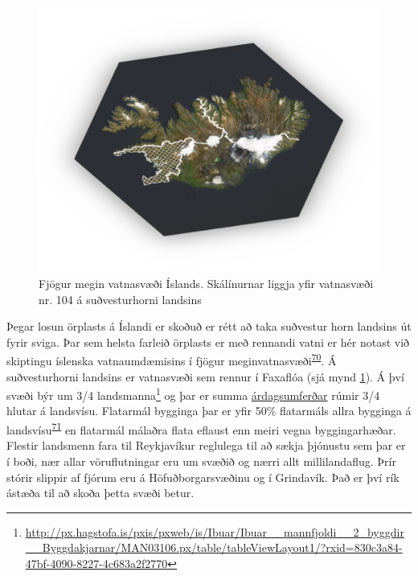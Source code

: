 \documentclass[icelandic,]{book}
\let\rmarkdownfootnote\footnote%
\def\footnote{\protect\rmarkdownfootnote}
\begin{document}
\begin{figure}

{\centering \includegraphics[width=1\linewidth]{myndir/map} 

}

\caption{Fjögur megin vatnasvæði Íslands. Skálínurnar liggja yfir vatnasvæði nr. 104 á suðvesturhorni landsins}\label{fig:vatnasvidsv}
\end{figure}

Þegar losun örplasts á Íslandi er skoðuð er rétt að taka suðvestur horn landsins út fyrir sviga. Þar sem helsta farleið örplasts er með rennandi vatni er hér notast við skiptingu íslenska vatnaumdæmisins í fjögur meginvatnasvæði\textsuperscript{\protect\hyperlink{ref-Bj2012}{70}}. Á suðvesturhorni landsins er vatnasvæði sem rennur í Faxaflóa (sjá mynd \ref{fig:vatnasvidsv}). Á því svæði býr um 3/4 landsmanna\footnote{\url{http://px.hagstofa.is/pxis/pxweb/is/Ibuar/Ibuar__mannfjoldi__2_byggdir__Byggdakjarnar/MAN03106.px/table/tableViewLayout1/?rxid=830c3a84-47bf-4090-8227-4c683a2f2770}} og þar er summa \href{http://www.vegagerdin.is/upplysingar-og-utgafa/umferdin/adferdarfraedi-talninga/}{árdagsumferðar} rúmir 3/4 hlutar á landsvísu. Flatarmál bygginga þar er yfir 50\% flatarmáls allra bygginga á landsvísu\textsuperscript{\protect\hyperlink{ref-OpenStreetMap}{71}} en flatarmál málaðra flata eflaust enn meiri vegna byggingarhæðar. Flestir landsmenn fara til Reykjavíkur reglulega til að sækja þjónustu sem þar er í boði, nær allar vöruflutningar eru um svæðið og nærri allt millilandaflug. Þrír stórir slippir af fjórum eru á Höfuðborgarsvæðinu og í Grindavík. Það er því rík ástæða til að skoða þetta svæði betur.
\end{document}
